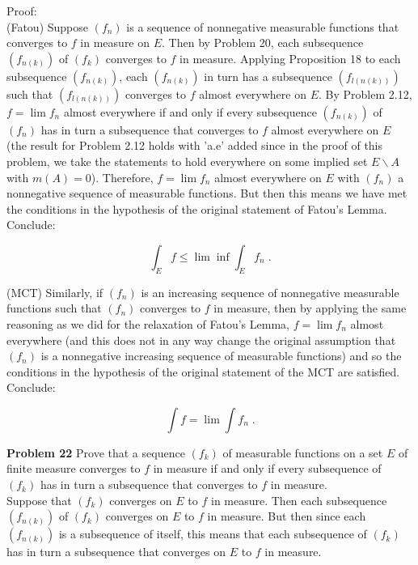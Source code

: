\documentclass[a4paper]{article}
\begin{document}
Proof: \\

(Fatou) Suppose $(f_n)$ is a sequence of nonnegative measurable functions that converges to $f$ in measure on $E$. Then by Problem 20, each subsequence $(f_{n(k)})$ of $(f_k)$ converges to $f$ in measure. Applying Proposition 18 to each subsequence $(f_{n(k)})$, each $(f_{n(k)})$ in turn has a subsequence $(f_{l(n(k))})$ such that $(f_{l(n(k))})$ converges to $f$ almost everywhere on $E$. By Problem 2.12, $f = \lim f_n$ almost everywhere if and only if every subsequence $(f_{n(k)})$ of $(f_n)$ has in turn a subsequence that converges to $f$ almost everywhere on $E$ (the result for Problem 2.12 holds with 'a.e' added since in the proof of this problem, we take the statements to hold everywhere on some implied set $E\backslash A$ with $m(A) = 0$). Therefore, $f = \lim f_n$ almost everywhere on $E$ with $(f_n)$ a nonnegative sequence of measurable functions. But then this means we have met the conditions in the hypothesis of the original statement of Fatou's Lemma. Conclude:

$$\int_E f \leq \lim \inf \int_E f_n \;.$$

(MCT) Similarly, if $(f_n)$ is an increasing sequence of nonnegative measurable functions such that $(f_n)$ converges to $f$ in measure, then by applying the same reasoning as we did for the relaxation of Fatou's Lemma, $f = \lim f_n$ almost everywhere (and this does not in any way change the original assumption that $(f_n)$ is a nonnegative increasing sequence of measurable functions) and so the conditions in the hypothesis of the original statement of the MCT are satisfied. Conclude:

$$\int f = \lim \int f_n \;.$$ 

{\bf Problem  22} Prove that a sequence $(f_k)$ of measurable functions on a set $E$ of finite measure converges to $f$ in measure if and only if every subsequence of $(f_k)$ has in turn a subsequence that converges to $f$ in measure. \\

Suppose that $(f_k)$ converges on $E$ to $f$ in measure. Then each subsequence $(f_{n(k)})$ of $(f_k)$ converges on $E$ to $f$ in measure. But then since each $(f_{n(k)})$ is a subsequence of itself, this means that each subsequence of $(f_k)$ has in turn a subsequence that converges on $E$ to $f$ in measure. \\
\end{document}
